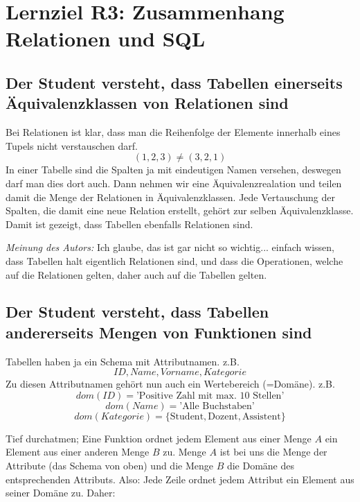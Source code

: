 \section{Lernziel R3: Zusammenhang Relationen und SQL}

\subsection{Der Student versteht, dass Tabellen einerseits Äquivalenzklassen von Relationen sind}
Bei Relationen ist klar, dass man die Reihenfolge der Elemente innerhalb eines Tupels nicht verstauschen darf.
\begin{equation*}
  (1,2,3) \neq (3,2,1)
\end{equation*}
In einer Tabelle sind die Spalten ja mit eindeutigen Namen versehen, deswegen darf man dies dort auch. Dann nehmen wir eine Äquivalenzrealation und teilen damit die Menge der Relationen in Äquivalenzklassen. Jede Vertauschung der Spalten, die damit eine neue Relation erstellt, gehört zur selben Äquivalenzklasse. Damit ist gezeigt, dass Tabellen ebenfalls Relationen sind.

\emph{Meinung des Autors:} Ich glaube, das ist gar nicht so wichtig... einfach wissen, dass Tabellen halt eigentlich Relationen sind, und dass die Operationen, welche auf die Relationen gelten, daher auch auf die Tabellen gelten.
\subsection{Der Student versteht, dass Tabellen andererseits Mengen von Funktionen sind}
Tabellen haben ja ein Schema mit Attributnamen. z.B.
\begin{equation*}
  ID, Name, Vorname, Kategorie
\end{equation*}
Zu diesen Attributnamen gehört nun auch ein Wertebereich (=Domäne). z.B.
\begin{equation*}
  dom(ID) = \text{'Positive Zahl mit max. 10 Stellen'}
\end{equation*}
\begin{equation*}
  dom(Name) = \text{'Alle Buchstaben'}
\end{equation*}
\begin{equation*}
  dom(Kategorie) = \{\text{Student}, \text{Dozent}, \text{Assistent}\}
\end{equation*}

Tief durchatmen; Eine Funktion ordnet jedem Element aus einer Menge \(A\) ein Element aus einer anderen Menge \(B\) zu. Menge \(A\) ist bei uns die Menge der Attribute (das Schema von oben) und die Menge \(B\) die Domäne des entsprechenden Attributs.
Also: Jede Zeile ordnet jedem Attribut ein Element aus seiner Domäne zu. Daher:

